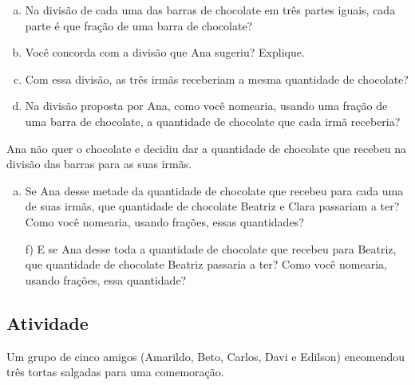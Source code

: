 \documentclass[a4,12pt]{book}
\begin{document}
\begin{enumerate}[a)] %
  \item Na divisão de cada uma das barras de chocolate em três partes iguais, cada parte é que fração de uma barra de chocolate?
  \item Você concorda com a divisão que Ana sugeriu? Explique. 
  \item Com essa divisão, as três irmãs receberiam a mesma quantidade de chocolate? 
  \item Na divisão proposta por Ana, como você nomearia, usando uma fração de uma barra de chocolate, a quantidade de chocolate que cada irmã receberia? 
\end{enumerate}
  
Ana não quer o chocolate e decidiu dar a quantidade de chocolate que recebeu na divisão das barras para as suas irmãs.

\begin{enumerate}[e)]
\item Se Ana desse metade da quantidade de chocolate que recebeu para cada uma de suas irmãs, que quantidade de chocolate Beatriz e Clara passariam a ter? Como você nomearia, usando frações, essas quantidades?  
\item[f)] E se Ana desse toda a quantidade de chocolate que recebeu para Beatriz, que quantidade de chocolate  Beatriz passaria a ter? Como você nomearia, usando frações, essa quantidade?
\end{enumerate} %


\subsection{Atividade}

Um grupo de cinco amigos (Amarildo, Beto, Carlos, Davi e Edilson) encomendou três tortas salgadas para uma comemoração.

\begin{center}
  
\end{center}
 
\end{document}
